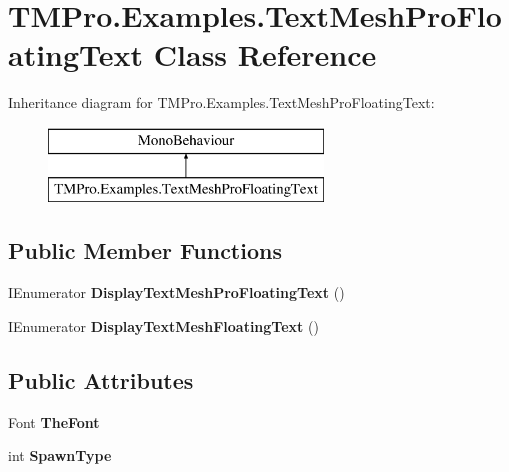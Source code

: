 \hypertarget{class_t_m_pro_1_1_examples_1_1_text_mesh_pro_floating_text}{}\section{T\+M\+Pro.\+Examples.\+Text\+Mesh\+Pro\+Floating\+Text Class Reference}
\label{class_t_m_pro_1_1_examples_1_1_text_mesh_pro_floating_text}
Inheritance diagram for T\+M\+Pro.\+Examples.\+Text\+Mesh\+Pro\+Floating\+Text\+:\begin{figure}[H]
\begin{center}
\leavevmode
\includegraphics[height=2.000000cm]{class_t_m_pro_1_1_examples_1_1_text_mesh_pro_floating_text}
\end{center}
\end{figure}
\subsection*{Public Member Functions}
\begin{DoxyCompactItemize}
\item 
\mbox{\label{class_t_m_pro_1_1_examples_1_1_text_mesh_pro_floating_text_a2d85960b568e04dd6dcd05db9c65fe69}} 
I\+Enumerator {\bfseries Display\+Text\+Mesh\+Pro\+Floating\+Text} ()
\item 
\mbox{\label{class_t_m_pro_1_1_examples_1_1_text_mesh_pro_floating_text_a44484a164aa2ba2f4826a1d060a7ae5b}} 
I\+Enumerator {\bfseries Display\+Text\+Mesh\+Floating\+Text} ()
\end{DoxyCompactItemize}
\subsection*{Public Attributes}
\begin{DoxyCompactItemize}
\item 
\mbox{\label{class_t_m_pro_1_1_examples_1_1_text_mesh_pro_floating_text_a9bb498ea133aa1535bc4a6bdc76fa533}} 
Font {\bfseries The\+Font}
\item 
\mbox{\label{class_t_m_pro_1_1_examples_1_1_text_mesh_pro_floating_text_afa4a7158646022f85c2961f4a0edfb61}} 
int {\bfseries Spawn\+Type}
\end{DoxyCompactItemize}
